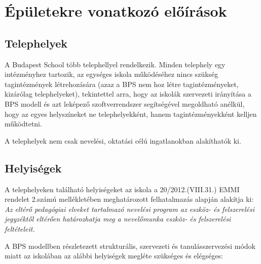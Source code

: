 \hypertarget{epuletekre-vonatkozo-eloirasok}{%
\section{Épületekre vonatkozó
előírások}\label{epuletekre-vonatkozo-eloirasok}}

\hypertarget{telephelyek}{%
\subsection{Telephelyek}\label{telephelyek}}

A Budapest School több telephellyel rendelkezik. Minden telephely egy
intézményhez tartozik, az egységes iskola működéséhez nincs szükség
tagintézmények létrehozására (azaz a BPS nem hoz létre tagintézményeket,
kizárólag telephelyeket), tekintettel arra, hogy az iskolák szervezeti
irányítása a BPS modell és azt leképező szoftverrendszer segítségével
megoldható anélkül, hogy az egyes helyszíneket ne telephelyekként, hanem
tagintézményekként kelljen működtetni.

A telephelyek nem csak nevelési, oktatási célú ingatlanokban
alakíthatók ki.

\hypertarget{helyisegek}{%
\subsection{Helyiségek}\label{helyisegek}}

A telephelyeken található helyiségeket az iskola a 20/2012.(VIII.31.)
EMMI rendelet 2.számú mellékletében meghatározott felhatalmazás alapján
alakítja ki: \emph{Az eltérő pedagógiai elveket tartalmazó nevelési
program az esz\-köz- és felszerelési jegyzéktől eltérően határozhatja meg
a nevelőmunka esz\-köz- és felszerelési feltételeit.}

A BPS modellben részletezett strukturális, szervezeti és tanulásszervezési
módok miatt az iskolában az alábbi helyiségek megléte
szükséges és elégséges:


